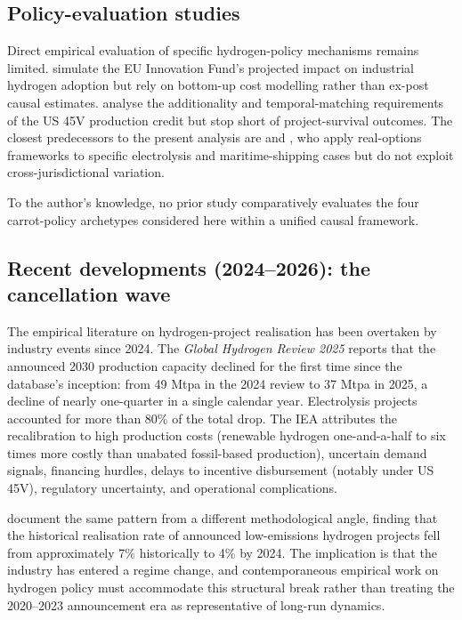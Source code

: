 \subsection{Policy-evaluation studies}

Direct empirical evaluation of specific hydrogen-policy mechanisms remains limited. \cite{neuwirth2023industry} simulate the EU Innovation Fund's projected impact on industrial hydrogen adoption but rely on bottom-up cost modelling rather than ex-post causal estimates. \cite{ricks2023minimizing} analyse the additionality and temporal-matching requirements of the US 45V production credit but stop short of project-survival outcomes. The closest predecessors to the present analysis are \cite{hosseini2022real} and \cite{lloyd2022maritime}, who apply real-options frameworks to specific electrolysis and maritime-shipping cases but do not exploit cross-jurisdictional variation.

To the author's knowledge, no prior study comparatively evaluates the four carrot-policy archetypes considered here within a unified causal framework.

\subsection{Recent developments (2024--2026): the cancellation wave}

The empirical literature on hydrogen-project realisation has been overtaken by industry events since 2024. The \cite{iea2025hydrogen} \emph{Global Hydrogen Review 2025} reports that the announced 2030 production capacity declined for the first time since the database's inception: from 49 Mtpa in the 2024 review to 37 Mtpa in 2025, a decline of nearly one-quarter in a single calendar year. Electrolysis projects accounted for more than 80\% of the total drop. The IEA attributes the recalibration to high production costs (renewable hydrogen one-and-a-half to six times more costly than unabated fossil-based production), uncertain demand signals, financing hurdles, delays to incentive disbursement (notably under US 45V), regulatory uncertainty, and operational complications. 

\cite{odenweller2025green} document the same pattern from a different methodological angle, finding that the historical realisation rate of announced low-emissions hydrogen projects fell from approximately 7\% historically to 4\% by 2024. The implication is that the industry has entered a regime change, and contemporaneous empirical work on hydrogen policy must accommodate this structural break rather than treating the 2020--2023 announcement era as representative of long-run dynamics.

